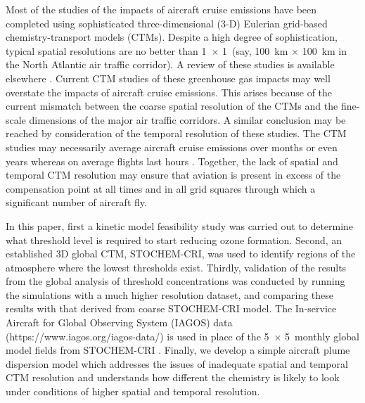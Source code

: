 Most of the studies of the impacts of aircraft cruise emissions have been completed using sophisticated three-dimensional (3-D) Eulerian grid-based chemistry-transport models (CTMs). Despite a high degree of sophistication, typical spatial resolutions are no better than 1~\textdegree $\times$ 1~\textdegree (say, 100~km $\times$ 100~km in the North Atlantic air traffic corridor). A review of these studies is available elsewhere \cite{Fuglestvedt1999}. Current CTM studies of these greenhouse gas impacts may well overstate the impacts of aircraft cruise emissions. This arises because of the current mismatch between the coarse spatial resolution of the CTMs and the fine-scale dimensions of the major air traffic corridors. A similar conclusion may be reached by consideration of the temporal resolution of these studies. The CTM studies may necessarily average aircraft cruise emissions over months or even years whereas on average flights last hours \cite{Wasiuk2016}. Together, the lack of spatial and temporal CTM resolution may ensure that aviation  is present in excess of the  compensation point at all times and in all grid squares through which a significant number of aircraft fly.

In this paper, first a kinetic model feasibility study was carried out to determine what  threshold level is required to start reducing ozone formation. Second, an established 3D global CTM, STOCHEM-CRI, was used to identify regions of the atmosphere where the lowest  thresholds exist. Thirdly, validation of the results from the global analysis of  threshold concentrations was conducted by running the simulations with a much higher resolution dataset, and comparing these results with that derived from coarse STOCHEM-CRI model. The In-service Aircraft for Global Observing System (IAGOS) data (https://www.iagos.org/iagos-data/) is used in place of the 5~\textdegree $\times$ 5~\textdegree monthly global model fields from STOCHEM-CRI \cite{Khan2021}. Finally, we develop a simple aircraft plume dispersion model which addresses the issues of inadequate spatial and temporal CTM resolution and understands how different the chemistry is likely to look under conditions of higher spatial and temporal resolution.